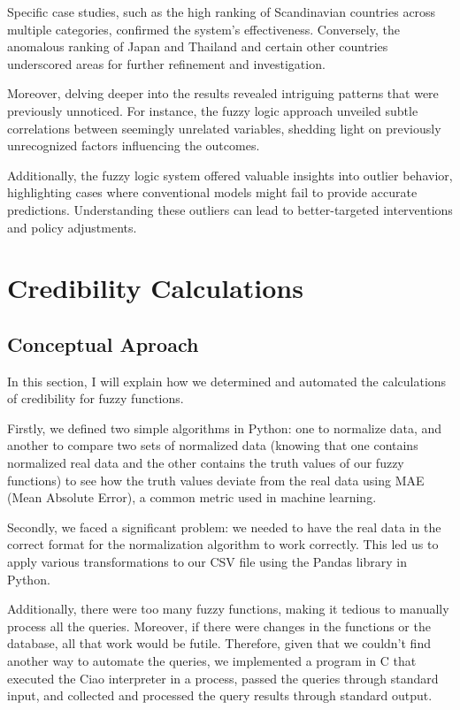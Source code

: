 \documentclass[fleqn,11pt]{article}
\begin{document}
Specific case studies, such as the high ranking of Scandinavian countries across multiple categories, confirmed the system's effectiveness. Conversely, the anomalous ranking of Japan and Thailand and certain other countries underscored areas for further refinement and investigation.

Moreover, delving deeper into the results revealed intriguing patterns that were previously unnoticed. For instance, the fuzzy logic approach unveiled subtle correlations between seemingly unrelated variables, shedding light on previously unrecognized factors influencing the outcomes.

Additionally, the fuzzy logic system offered valuable insights into outlier behavior, highlighting cases where conventional models might fail to provide accurate predictions. Understanding these outliers can lead to better-targeted interventions and policy adjustments.

\newpage
\section{Credibility Calculations}
\subsection{Conceptual Aproach}

In this section, I will explain how we determined and automated the calculations of credibility for fuzzy functions.

Firstly, we defined two simple algorithms in Python: one to normalize data, and another to compare two sets of normalized data (knowing that one contains normalized real data and the other contains the truth values of our fuzzy functions) to see how the truth values deviate from the real data using MAE (Mean Absolute Error), a common metric used in machine learning.

Secondly, we faced a significant problem: we needed to have the real data in the correct format for the normalization algorithm to work correctly. This led us to apply various transformations to our CSV file using the Pandas library in Python.

Additionally, there were too many fuzzy functions, making it tedious to manually process all the queries. Moreover, if there were changes in the functions or the database, all that work would be futile. Therefore, given that we couldn't find another way to automate the queries, we implemented a program in C that executed the Ciao interpreter in a process, passed the queries through standard input, and collected and processed the query results through standard output.
\end{document}
